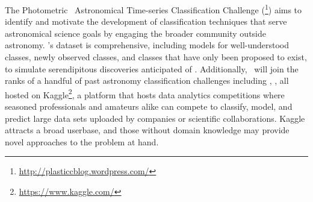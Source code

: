 The Photometric \lsst\ Astronomical Time-series Classification Challenge (\plasticc\footnote{\url{http://plasticcblog.wordpress.com/}}) aims to identify and motivate the development of classification techniques that serve astronomical science goals by engaging the broader community outside astronomy.
\plasticc's dataset is comprehensive, including models for well-understood classes, newly observed classes, and classes that have only been proposed to exist, to simulate serendipitous discoveries anticipated of \lsst.
Additionally, \plasticc\ will join the ranks of a handful of past astronomy classification challenges including \citep[MDM\footnote{\url{https://www.kaggle.com/c/mdm}}]{kitching_gravitational_2011}, \citep[the Dark Worlds challenge\footnote{\url{https://www.kaggle.com/c/DarkWorlds}}]{harvey_observing_2013} \citep[and the Galaxy Zoo challenge\footnote{\url{https://www.kaggle.com/c/galaxy-zoo-the-galaxy-challenge}}]{dieleman_rotation-invariant_2015}, all hosted on Kaggle\footnote{\url{https://www.kaggle.com/}}, a platform that hosts data analytics competitions where seasoned professionals and amateurs alike can compete to classify, model, and predict large data sets uploaded by companies or scientific collaborations.
Kaggle attracts a broad userbase, and those without domain knowledge may provide novel approaches to the problem at hand.

